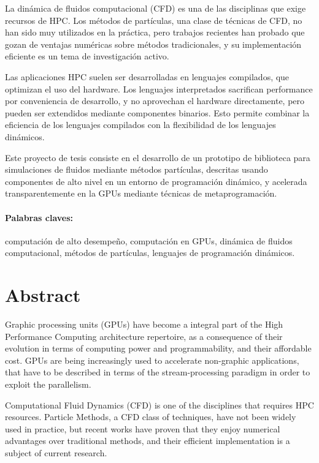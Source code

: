 \documentclass[11pt,spanish]{article}
\begin{document}
La dinámica de fluidos computacional (CFD) es una de las disciplinas que 
exige recursos de HPC. Los métodos de partículas, una clase de técnicas de CFD, 
no han sido muy utilizados en la práctica, pero trabajos recientes han probado
que gozan de ventajas numéricas sobre métodos tradicionales, y su implementación
eficiente es un tema de investigación activo.

Las aplicaciones HPC suelen ser desarrolladas en lenguajes compilados, que
optimizan el uso del hardware.  Los lenguajes interpretados sacrifican
performance por conveniencia de desarrollo, y no aprovechan el hardware
directamente, pero pueden ser extendidos mediante componentes binarios.  Esto
permite combinar la eficiencia de los lenguajes compilados con la flexibilidad
de los lenguajes dinámicos.

Este proyecto de tesis consiste en el desarrollo de un prototipo de biblioteca
para simulaciones de fluidos mediante métodos partículas, descritas usando
componentes de alto nivel en un entorno de programación dinámico, y acelerada
transparentemente en la GPUs mediante técnicas de metaprogramación.

\paragraph{Palabras claves:}
computación de alto desempeño,
computación en GPUs,
dinámica de fluidos computacional,
métodos de partículas,
lenguajes de programación dinámicos.

\newpage
\section*{Abstract}
Graphic processing units (GPUs) have become a integral part
of the High Performance Computing architecture repertoire, as a consequence of
their evolution in terms of computing power and programmability, and their
affordable cost.  GPUs are being increasingly used to accelerate non-graphic
applications, that have to be described in terms of the stream-processing
paradigm in order to exploit the parallelism.

Computational Fluid Dynamics (CFD) is one of the disciplines that requires HPC
resources.  Particle Methods, a CFD class of techniques, have not been widely
used in practice, but recent works have proven that they enjoy numerical
advantages over traditional methods, and their efficient implementation is a
subject of current research.
\end{document}
